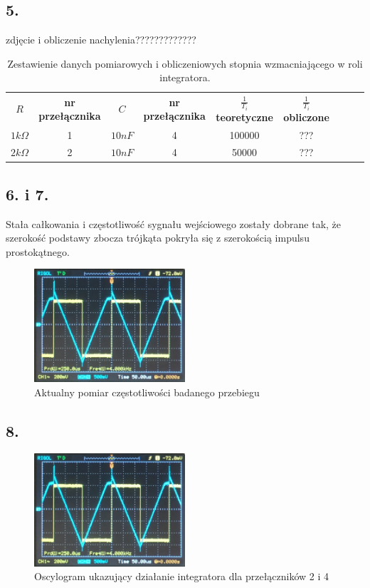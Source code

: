 \documentclass[polish,a4paper]{article}
\begin{document}
\subsection*{5.}
zdjęcie i obliczenie nachylenia?????????????\\
\begin{table}[!h]
\centering
\begin{tabular}{|c|c|c|c||c|c|c|c|c|}
\hline
\textbf{$R$} & \textbf{nr przełącznika} & \textbf{$C$} & \textbf{nr przełącznika} & \textbf{$\frac{1}{T_i}$ teoretyczne} & \textbf{$\frac{1}{T_i}$ obliczone }\\ 
\hhline{|=|=|=|=#=|=|=|=|=|}
$1k\Omega$ & 1 & $10nF$ & 4 & 100000 & ???  \\
\hline
$2k\Omega$ & 2 & $10nF$ & 4 & 50000 & ???\\
\hline
\end{tabular}
\caption{Zestawienie danych pomiarowych i obliczeniowych stopnia wzmacniającego w roli integratora.}
\label{fig:dane_pomiarowe2}
\end{table}
\newpage
\subsection*{6. i 7.}
Stała całkowania i częstotliwość sygnału wejściowego zostały dobrane tak, że szerokość podstawy zbocza trójkąta pokryła się z szerokością impulsu prostokątnego.

\begin{figure}[!h]
\centering
\includegraphics[width=0.5\textwidth]{czestotliwosc2}
\caption{Aktualny pomiar częstotliwości badanego przebiegu}
\end{figure}
\subsection*{8.}
\begin{figure}[!h]
\centering
\includegraphics[width=0.5\textwidth]{czestotliwosc2}
\caption{Oscylogram ukazujący działanie integratora dla przełączników 2 i 4}
\end{figure}
\newpage
\end{document}
